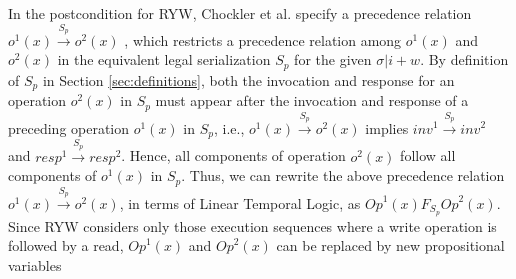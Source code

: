 \documentclass[journal,compsoc]{IEEEtran}
\begin{document}
 \par In the postcondition for RYW, Chockler et al.  specify a precedence relation $\mathit{o}^1(x) \xrightarrow{S_p} \mathit{o}^2(x)$ , which  restricts a precedence relation among $\mathit{o}^1(x)$ and $\mathit{o}^2(x)$ in the equivalent legal serialization ${S_p}$ for the given $\sigma |i + w$.   By definition of $S_p$ in Section \ref{sec:definitions}, both the invocation and response for  an operation $\mathit{o}^2(x)$ in $S_p$ must appear after the invocation and response of a preceding operation $\mathit{o}^1(x)$ in $S_p$, i.e., $ \mathit{o}^1(x) \xrightarrow{S_p} \mathit{o}^2(x) $ implies $ \mathit{inv}^1 \xrightarrow{S_p} \mathit{inv}^2 $ and $ \mathit{resp}^1 \xrightarrow{S_p} \mathit{resp}^2 $.  
    Hence, all components of operation $\mathit{o}^2(x)$ follow all components of $\mathit{o}^1(x)$ in $S_p$. Thus, we can rewrite the above precedence relation 
  $ \mathit{o}^1(x) \xrightarrow{S_p} \mathit{o}^2(x) $, in terms of Linear Temporal Logic, %
    as 
  $\mathit{Op}^1(x) F_{S_p} \mathit{Op}^2(x)$. %
  Since RYW considers only those execution sequences where a write operation is followed by a read, $\mathit{Op}^1(x)$ and $\mathit{Op}^2(x)$ can be  replaced  by new propositional variables
\end{document}
